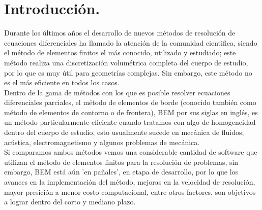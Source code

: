 \chapter{Introducción.}
\pagestyle{plain}
\setcounter{page}{1}
Durante los últimos años el desarrollo de nuevos métodos de resolución de ecuaciones diferenciales ha llamado la atención de la comunidad cientifica, siendo el método de elementos finitos el más conocido, utilizado y estudiado; este método realiza una discretización volumétrica completa del cuerpo de estudio, por lo que es muy útil para geometrías complejas. Sin embargo, este método no es el más eficiente en todos los casos.\\
Dentro de la gama de métodos con los que es posible resolver ecuaciones diferenciales parciales, el método de elementos de borde (conocido también como método de elementos de contorno o de frontera), BEM por sus siglas en inglés, es un método particularmente eficiente cuando tratamos con algo de homogeneidad dentro del cuerpo de estudio, esto usualmente sucede en mecánica de fluidos, acústica, electromagnetismo y algunos problemas de mecánica.\\
Si comparamos ambos métodos vemos una considerable cantidad de software que utilizan el método de elementos finitos para la resolución de problemas, sin embargo, BEM está aún 'en pañales', en etapa de desarrollo, por lo que los avances en la implementación del método, mejoras en la velocidad de resolución, mayor presición a menor costo computacional, entre otros factores, son objetivos a lograr dentro del corto y mediano plazo.\\
